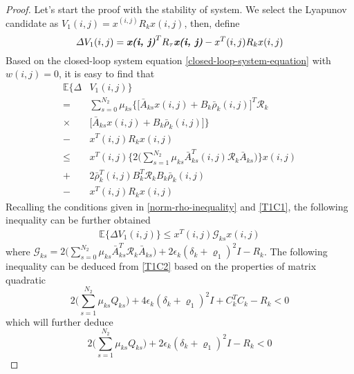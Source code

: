 \documentclass[conference]{IEEEtran}
\begin{document}
\begin{proof}
	Let's start the proof with the stability of system. We select the Lyapunov candidate as $V_{1}(i,j) = x^(i,j)R_{k}x(i,j)$, then, define
	\begin{equation}\label{VAR-DELTA-V1}
	\varDelta V_{1}(i,j) = \emph{\textbf{x(i, j)}}^{T}R_{\tau}\emph{\textbf{x(i, j)}} - x^{T}(i,j)R_{k}x(i,j)
	\end{equation}
	Based on the closed-loop system equation \eqref{closed-loop-system-equation} with $w(i,j)=0$, it is easy to find that
	\begin{equation}
	\begin{split}
	\mathbb{E}\{\varDelta &V_{1}(i,j) \}\\
	= & \sum_{s=0}^{N_{2}}\mu_{ks}\Big\{\big[\bar{A}_{ks}x(i,j)+B_{k}\bar{\rho}_{k}(i,j)\big]^{T}\mathcal{R}_{k}\\
	\times&\big[\bar{A}_{ks}x(i,j)+B_{k}\bar{\rho}_{k}(i,j)\big]\Big\}\\
	-& x^{T}(i,j)R_{k}x(i,j) \\
	\leq &x^{T}(i,j) \Big\{2\big(\sum_{s=1}^{N_{2}}\mu_{ks}\bar{A}^{T}_{ks}(i,j)\mathcal{R}_{k}\bar{A}_{ks}\big)\Big\}x(i,j)\\ +&2\bar{\rho}^{T}_{k}(i,j)B^{T}_{k}\mathcal{R}_{k}B_{k}\bar{\rho}_{k}(i,j) \\
	-&  x^{T}(i,j)R_{k}x(i,j)
	\end{split}
	\end{equation}
	Recalling the conditions given in \eqref{norm-rho-inequality} and \eqref{T1C1}, the following inequality can be further obtained
	\begin{equation}\label{combine-one-1}
	\begin{split}
		\mathbb{E}\{\varDelta  V_{1}(i,j) \} \leq x^{T}(i,j)\mathcal{G}_{ks}x(i,j)
	\end{split}
	\end{equation}
	where $\mathcal{G}_{ks}= 2\big(\sum_{s=0}^{N_{2}}\mu_{ks}\bar{A}^{T}_{ks}\mathcal{R}_{k}\bar{A}_{ks}\big)
	+ 2\epsilon_{k}(\delta_{k}+\varrho_{1})^{2}I- R_{k}$.
	The following inequality can be deduced from \eqref{T1C2} based on the properties of  matrix quadratic
	\begin{equation}
	2\big(\sum_{s=1}^{N_{2}}\mu_{ks}Q_{ks}\big)+4\epsilon_{k}(\delta_{k}+\varrho_{1})^{2}I+C^{T}_{k}C_{k}-R_{k} < 0
	\end{equation}
	which will further deduce
	\begin{equation}\label{combine-one-2}
			2\big(\sum_{s=1}^{N_{2}}\mu_{ks}Q_{ks}\big)+2\epsilon_{k}(\delta_{k}+\varrho_{1})^{2}I-R_{k} < 0

\end{equation}
\end{proof}
\end{document}
